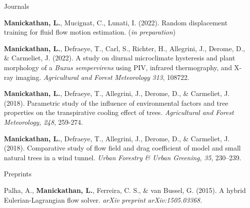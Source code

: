 \documentclass[11pt, a4paper]{preamble/awesome-cv-novo}
\begin{document}
\newpage


\begin{cventries}

  \cvpubentry
  {Journals} %
  {
    \begin{cvitems}
      \item {\textbf{Manickathan, L.}, Mucignat, C., Lunati, I. (2022). Random displacement training for fluid flow
             motion estimation. {\bodyfontlight(\textit{in preparation})}}
      \item {\textbf{Manickathan, L.}, Defraeye, T., Carl, S., Richter, H., Allegrini, J., Derome, D., \& Carmeliet,
             J. (2022). A study on diurnal microclimate hysteresis and plant morphology of a \textit{Buxus
             sempervirens} using PIV, infrared thermography, and X-ray imaging. {\bodyfontlight\textit{Agricultural
             and Forest Meteorology 313}, 108722.}}
      \item {\textbf{Manickathan, L.}, Defraeye, T., Allegrini, J., Derome, D., \& Carmeliet, J. (2018). Parametric
             study of the influence of environmental factors and tree properties on the transpirative cooling
             effect of trees. {\bodyfontlight\textit{Agricultural and Forest Meteorology, 248}, 259-274.}}
      \item {\textbf{Manickathan, L.}, Defraeye, T., Allegrini, J., Derome, D., \& Carmeliet, J. (2018).
             Comparative study of flow field and drag coefficient of model and small natural trees in a wind tunnel.
             {\bodyfontlight\textit{Urban Forestry \& Urban Greening, 35}, 230–239.}}
    \end{cvitems}
  }

  \cvpubentry
  {Preprints}
  {
    \begin{cvitems}
      \item {Palha, A., \textbf{Manickathan, L.}, Ferreira, C. S., \& van Bussel, G. (2015). A hybrid
             Eulerian-Lagrangian flow solver. {\bodyfontlight\textit{arXiv preprint arXiv:1505.03368.}}}
    \end{cvitems}
  }


\end{cventries}
\end{document}
